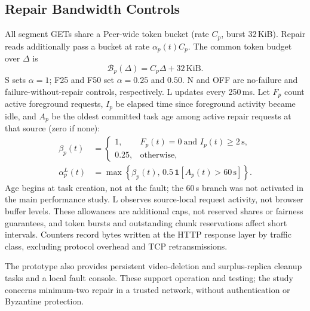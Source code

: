 \subsection{Repair Bandwidth Controls}
All segment GETs share a Peer-wide token bucket (rate $C_p$, burst
32\,KiB). Repair reads additionally pass a bucket at rate
$\alpha_p(t)C_p$. The common token budget over $\Delta$ is
\begin{equation}
 \mathcal{B}_p(\Delta)=C_p\Delta+32\,\mathrm{KiB}.
 \label{eq:shared-budget}
\end{equation}
S sets $\alpha=1$;
F25 and F50 set $\alpha=0.25$ and $0.50$.
N and OFF are no-failure and failure-without-repair controls, respectively.
L updates every 250\,ms. Let $F_p$ count active foreground requests, $I_p$
be elapsed time since foreground activity became idle, and $A_p$ be the
oldest committed task age among active repair requests at that source
(zero if none):
\begin{equation}
 \begin{aligned}
 \beta_p(t)&=\begin{cases}
 1,&F_p(t)=0\ \text{and }I_p(t)\geq2\,\mathrm{s},\\
 0.25,&\text{otherwise},
 \end{cases}\\
 \alpha_p^{L}(t)&=\max\!\left\{\beta_p(t),\,
          0.5\,\mathbf{1}[A_p(t)>60\,\mathrm{s}]\right\}.
 \end{aligned}
 \label{eq:load-aware}
\end{equation}
Age begins at task creation, not at the fault; the 60\,s branch was not
activated in the main performance study. L observes source-local request
activity, not browser buffer levels. These allowances are additional caps,
not reserved shares or fairness guarantees, and token bursts and outstanding
chunk reservations affect short intervals. Counters record bytes written
at the HTTP response layer by traffic class, excluding protocol overhead
and TCP retransmissions.

The prototype also provides persistent video-deletion and surplus-replica
cleanup tasks and a local fault console. These support operation and testing;
the study concerns minimum-two repair in a trusted network, without
authentication or Byzantine protection.
